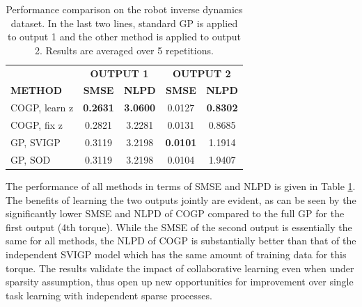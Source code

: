 \begin{table}[t]
\caption{Performance comparison on the robot inverse dynamics dataset. In the last two lines, standard GP is applied to output 1 and the other method is applied to output 2. Results are averaged over 5 repetitions. }
\label{tab:robotarm}
\begin{center}
\begin{tabular}{lcccc}
\toprule
& \multicolumn{2}{c}{\textbf{OUTPUT 1}} & \multicolumn{2}{c}{\textbf{OUTPUT 2}} \\ \cmidrule(r){2-5}
\textbf{METHOD} & \textbf{SMSE} & \textbf{NLPD} & \textbf{SMSE} & \textbf{NLPD}\\ 
 \midrule
COGP, learn z & \textbf{0.2631} & \textbf{3.0600} & 0.0127 & \textbf{0.8302} \\
COGP, fix z & 0.2821& 3.2281 & 0.0131 & 0.8685 \\
GP, SVIGP & 0.3119 & 3.2198 & \textbf{0.0101} & 1.1914 \\
GP, SOD & 0.3119 & 3.2198 & 0.0104 & 1.9407 \\
\bottomrule
\end{tabular}
\end{center}
\end{table}

The performance of all methods in terms of SMSE and NLPD is given in Table \ref{tab:robotarm}.
The benefits of learning the two outputs jointly are evident, as can be seen by the significantly lower SMSE and NLPD of COGP compared to the full GP for the first output (4th torque).
While the SMSE of the second output is essentially the same for all methods, the NLPD of COGP is substantially better than that of the independent SVIGP model which has the same amount of training data for this torque.
The results validate the impact of collaborative learning even when under sparsity assumption, thus open up new opportunities for improvement over single task learning with independent sparse processes.

